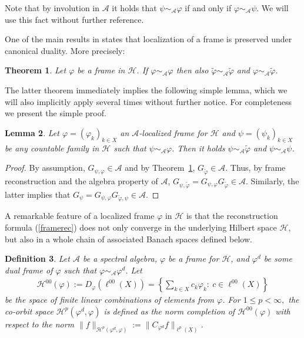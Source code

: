 \documentclass{amsart}
\newtheorem{theorem}{Theorem}
\newtheorem{def.}[theorem]{Definition}
\newtheorem{lem.}[theorem]{Lemma}
\def\Hil{\mathcal{H}}
\newcommand{\A}[0]{{\mathcal{A}}}
\renewcommand{\H}{{\mathcal{H}}}
\begin{document}
Note that by involution in $\A$ it holds that $\psi \sim_{\A} \varphi$ if and only if $\varphi \sim_{\A} \psi$. We will use this fact without further reference.

One of the main results in \cite{forngroech1} states that localization of a frame is preserved under canonical duality. More precisely:

\begin{theorem}\label{dualloc}\cite[Theorem~3.6]{forngroech1}
Let $\varphi$ be a frame in $\Hil$. If $\varphi \sim_{\A} \varphi$ then also $\widetilde{\varphi} \sim_{\A} \widetilde{\varphi}$ and $\varphi \sim_{\A} \widetilde{\varphi}$.   
\end{theorem}

The latter theorem immediately implies the following simple lemma, which we will also implicitly apply several times without further notice. For completeness we present the simple proof.

\begin{lem.}\label{easy}
Let $\varphi = (\varphi_k)_{k\in X}$ an $\A$-localized frame for $\Hil$ and $\psi = (\psi_k)_{k\in X}$ be any countable family in $\Hil$ such that $\psi \sim_{\A} \varphi$. Then it holds $\psi \sim_{\A} \widetilde{\varphi}$ and $\psi \sim_{\A} \psi$.
\end{lem.}

\begin{proof}
By assumption, $G_{\psi,\varphi}\in \A$ and by Theorem~\ref{dualloc}, $G_{\widetilde{\varphi}}\in \A$. Thus, by frame reconstruction and the algebra property of $\A$, $G_{\psi,\widetilde{\varphi}} = G_{\psi,\varphi} G_{\widetilde{\varphi}}\in \A$. Similarly, the latter implies that $G_{\psi} = G_{\psi,\varphi} G_{\widetilde{\varphi},\psi} \in \A$.   
\end{proof}

A remarkable feature of a localized frame $\varphi$ in $\Hil$ is that the reconstruction formula (\ref{framerec}) does not only converge in the underlying Hilbert space $\Hil$, but also in a whole chain of associated Banach spaces defined below. 

\begin{def.}\label{Hpdef}\cite[Definition~5]{forngroech1}
Let $\mathcal{A}$ be a spectral algebra, $\varphi$ be a frame for $\Hil$, and $\varphi^d$ be some dual frame of $\varphi$ such that $\varphi \sim_{\A} \varphi^d$. Let
\begin{equation}
\begin{split}
\H^{00}(\varphi) := D_{\varphi}(\ell^{00}(X)) = \left\lbrace  \sum_{k \in X} c_k   \varphi_k :  \    c\in \ell^{00} (X) \right\rbrace
\end{split}
\label{eq:H_00}
\end{equation} 
be the space of finite linear combinations of elements from $\varphi$. For $1\le p<\infty,$ the \emph{co-orbit space} $\H^p (\varphi^d,\varphi)$ is defined as the norm completion of $\H^{00}(\varphi)$ with respect to the norm $\|f\|_{\H^p(\varphi^d,\varphi)}:=\big\| C_{\varphi^d} f \big\|_{\ell^p(X)}$.
\end{def.}
\end{document}
